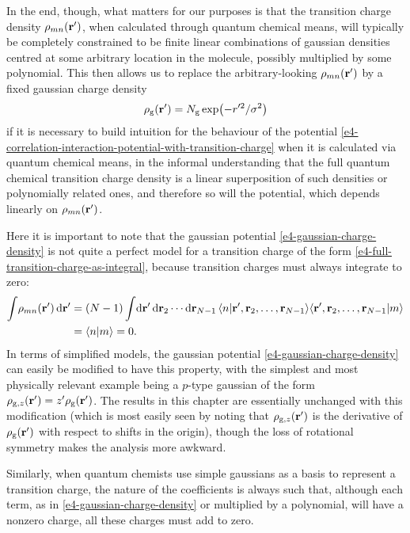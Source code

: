 In the end, though, what matters for our purposes is that the transition charge density $\rho_{mn}(\vb{r}')$, when calculated through quantum chemical means, will typically be completely constrained to be finite linear combinations of gaussian densities centred at some arbitrary location in the molecule, possibly multiplied by some polynomial. This then allows us to replace the arbitrary-looking $\rho_{mn}(\vb{r}')$ by a fixed gaussian charge density
\begin{equation}
\rho_\mathrm{g}(\vb{r}')=N_\mathrm{g} \exp(-r'^2/\sigma^2)
\label{e4-gaussian-charge-density}
\end{equation}
if it is necessary to build intuition for the behaviour of the potential \eqref{e4-correlation-interaction-potential-with-transition-charge} when it is calculated via quantum chemical means, in the informal understanding that the full quantum chemical transition charge density is a linear superposition of such densities or polynomially related ones, and therefore so will the potential, which depends linearly on $\rho_{mn}(\vb{r}')$.


Here it is important to note that the gaussian potential \eqref{e4-gaussian-charge-density} is not quite a perfect model for a transition charge of the form \eqref{e4-full-transition-charge-as-integral}, because transition charges must always integrate to zero:
\begin{align}
\int \!
\rho_{mn}(\vb{r}')
\, \mathrm{d}\vb{r}'
& =
(N-1)
\int\!
\mathrm{d}\vb{r}' \,
\mathrm{d}\vb{r}_2 \cdots \mathrm{d}\vb{r}_{N-1} 
\braket{n}{\vb{r}',\vb{r}_2,\ldots,\vb{r}_{N-1}} \!
\braket{\vb{r}',\vb{r}_2,\ldots,\vb{r}_{N-1}}{m}
\nonumber \\ & =
\braket{n}{m}
= 0
.
\end{align}
In terms of simplified models, the gaussian potential \eqref{e4-gaussian-charge-density} can easily be modified to have this property, with the simplest and most physically relevant example being a $p$-type gaussian of the form $\rho_{\mathrm{g}, z} (\vb{r}')=z'\rho_\mathrm{g}(\vb{r}')$. The results in this chapter are essentially unchanged with this modification (which is most easily seen by noting that $\rho_{\mathrm{g}, z} (\vb{r}')$ is the derivative of $\rho_\mathrm{g}(\vb{r}')$ with respect to shifts in the origin), though the loss of rotational symmetry makes the analysis more awkward.

Similarly, when quantum chemists use simple gaussians as a basis to represent a transition charge, the nature of the coefficients is always such that, although each term, as in \eqref{e4-gaussian-charge-density} or multiplied by a polynomial, will have a nonzero charge, all these charges must add to zero.



